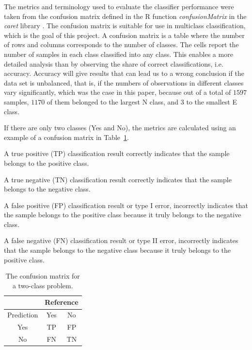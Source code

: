 \documentclass[sn-mathphys-num]{sn-jnl}%
\begin{document}
The metrics and terminology used to evaluate the classifier performance were taken from the confusion matrix defined in the R function \textit{confusionMatrix} in the \textit{caret} library \cite{kuhn2008building, altman1994diagnostic, dg1994diagnostic, velez2007balanced, rdocumentationConfusionMatrixFunction}. The confusion matrix is suitable for use in multiclass classification, which is the goal of this project. A confusion matrix is a table where the number of rows and columns corresponds to the number of classes. The cells report the number of samples in each class classified into any class. This enables a more detailed analysis than by observing the share of correct classifications, i.e. accuracy. Accuracy will give results that can lead us to a wrong conclusion if the data set is unbalanced, that is, if the numbers of observations in different classes vary significantly, which was the case in this paper, because out of a total of $1597$ samples, $1170$ of them belonged to the largest N class, and $3$ to the smallest E class.

If there are only two classes (Yes and No), the metrics are calculated using an example of a confusion matrix in Table~\ref{tab:cm}.

A true positive (TP) classification result correctly indicates that the sample belongs to the positive class.

A true negative (TN) classification result correctly indicates that the sample belongs to the negative class.
 
A false positive (FP) classification result or type I error, incorrectly indicates that the sample belongs to the positive class because it truly belongs to the negative class.

A false negative (FN) classification result or type II error, incorrectly indicates that the sample belongs to the negative class because it truly belongs to the positive class.

\begin{table}[!ht]
    \centering
    \caption{The confusion matrix for a two-class problem.}
	\label{tab:cm}
	\begin{tabular}{|c|c|c|}
		\hline
		 & \multicolumn{2}{|c|}{Reference} \\ \hline
        Prediction & Yes & No \\ \hline
        Yes & TP & FP \\ \hline
        No & FN & TN \\ \hline
	\end{tabular}
\end{table}
\end{document}

